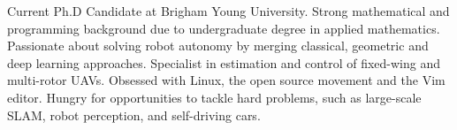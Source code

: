 

\begin{cvparagraph}

Current Ph.D Candidate at Brigham Young University. Strong mathematical and programming background due to undergraduate degree in applied mathematics. Passionate about solving robot autonomy by merging classical, geometric and deep learning approaches. Specialist in estimation and control of fixed-wing and multi-rotor UAVs. Obsessed with Linux, the open source movement and the Vim editor. Hungry for opportunities to tackle hard problems, such as large-scale SLAM, robot perception, and self-driving cars.
\end{cvparagraph}
